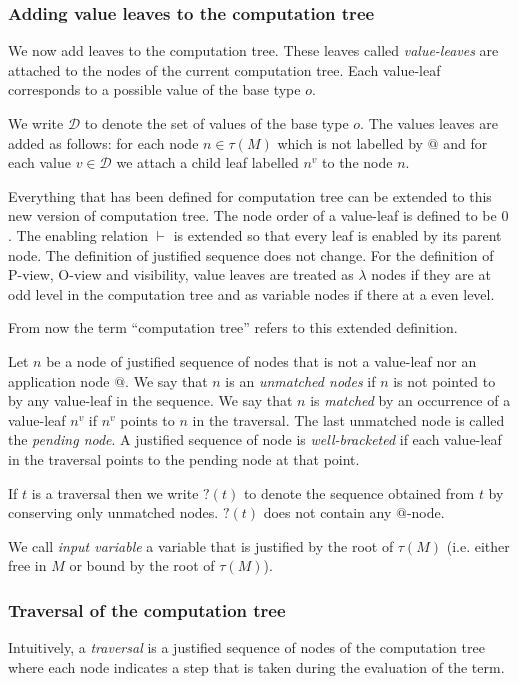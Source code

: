 \subsubsection{Adding value leaves to the computation tree}
\label{sec:adding_value_leaves}

We now add leaves to the computation tree. These leaves called
\emph{value-leaves} are attached to the nodes of the current computation tree.
Each value-leaf corresponds to a possible value of the base type $o$.

We write $\mathcal{D}$ to denote the set of values of the base type $o$.
The values leaves are added as follows: for each node $n \in \tau(M)$ which is not labelled by $@$
and for each value $v \in \mathcal{D}$ we attach a child leaf labelled $n^v$ to the node $n$.

Everything that has been defined for computation tree can be extended to this new version of computation tree.
The node order of a value-leaf is defined to be $0$. The enabling relation $\vdash$ is extended so that every leaf is enabled
by its parent node. The definition of justified sequence does not change.
For the definition of P-view, O-view and visibility, value leaves are treated as $\lambda$ nodes if they are at odd level in the computation tree and
as variable nodes if there at a even level.

From now the term ``computation tree'' refers to this extended definition.


Let $n$ be a node of justified sequence of nodes that is not a value-leaf nor an application node $@$.
We say that $n$ is an \emph{unmatched nodes} if $n$ is not pointed to by any value-leaf in the sequence.
We say that $n$ is \emph{matched} by an occurrence of a value-leaf $n^v$ if $n^v$ points to $n$ in the traversal.
The last unmatched node is called the \emph{pending node}.
A justified sequence of node is \emph{well-bracketed} if
each value-leaf in the traversal points to the pending node at that point.

If $t$ is a traversal then we write $?(t)$ to denote the sequence
obtained from $t$ by conserving only unmatched nodes. $?(t)$ does not contain any $@$-node.

We call \emph{input variable} a variable that is justified by the root of $\tau(M)$ (i.e. either free in $M$ or bound by the root of $\tau(M)$).

\subsubsection{Traversal of the computation tree}
Intuitively, a \emph{traversal} is a justified sequence of nodes of the computation tree where each node
indicates a step that is taken during the evaluation of the term.

